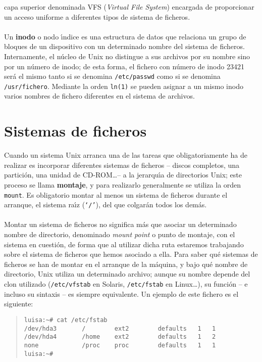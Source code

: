 capa superior denominada VFS ({\it Virtual File System}) encargada de 
proporcionar un acceso uniforme a diferentes tipos de sistema de ficheros.\\
\\Un {\bf inodo} o nodo \'{\i}ndice es una estructura de datos que relaciona un 
grupo 
de bloques de un dispositivo con un determinado nombre del sistema de ficheros.
Internamente, el n\'ucleo de Unix no distingue a sus archivos por su nombre
sino por un n\'umero de inodo; de esta forma, el fichero con n\'umero de inodo
23421 ser\'a el mismo tanto si se denomina {\tt /etc/passwd} como si se 
denomina {\tt /usr/fichero}. Mediante la orden {\tt ln(1)} se pueden asignar a
un mismo inodo varios nombres de fichero diferentes en el sistema de archivos.
\section{Sistemas de ficheros}
Cuando un sistema Unix arranca una de las tareas que obligatoriamente ha de
realizar es incorporar diferentes sistemas de ficheros -- discos completos, una 
partici\'on, una unidad de CD-ROM\ldots -- a la jerarqu\'{\i}a de
directorios Unix; este proceso se llama {\bf montaje}, y para realizarlo 
generalmente se
utiliza la orden {\tt mount}. Es obligatorio montar al menos un sistema de 
ficheros durante el arranque, el sistema ra\'{\i}z ({\tt `/'}), del que 
colgar\'an todos los dem\'as.\\
\\Montar un sistema de ficheros no significa m\'as que asociar un determinado 
nombre de directorio, denominado {\it mount point} o punto de montaje, con el 
sistema en cuesti\'on, de forma que al utilizar 
dicha ruta estaremos trabajando sobre el sistema de ficheros que hemos asociado 
a ella. Para saber qu\'e sistemas
de ficheros se han de montar en el arranque de la m\'aquina, y bajo qu\'e
nombre de directorio, Unix utiliza un determinado archivo; aunque su nombre 
depende del clon utilizado ({\tt /etc/vfstab} en Solaris, {\tt /etc/fstab} en 
Linux\ldots), su funci\'on -- e incluso su sintaxis -- es siempre equivalente. 
Un ejemplo de este fichero es el siguiente:
\begin{quote}
\begin{verbatim}
luisa:~# cat /etc/fstab
/dev/hda3       /        ext2        defaults   1   1
/dev/hda4       /home    ext2        defaults   1   2
none            /proc    proc        defaults   1   1
luisa:~#
\end{verbatim}
\end{quote}
